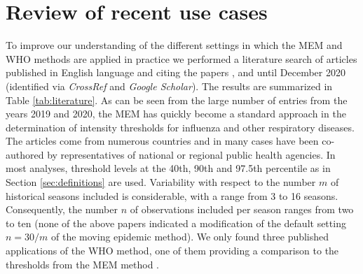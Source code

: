 \documentclass{article}
\begin{document}


\section{Review of recent use cases}
\label{sec:review}

To improve our understanding of the different settings in which the MEM and WHO methods are applied in practice we performed a literature search of articles published in English language and citing the papers \cite{Vega2015}, \cite{WHO2014} and \cite{WHO2017} until December 2020 (identified via \textit{CrossRef} and \textit{Google Scholar}). The results are summarized in Table \ref{tab:literature}. As can be seen from the large number of entries from the years 2019 and 2020, the MEM has quickly become a standard approach in the determination of intensity thresholds for influenza and other respiratory diseases. The articles come from numerous countries and in many cases have been co-authored by representatives of national or regional public health agencies. In most analyses, threshold levels at the 40th, 90th and 97.5th percentile as in Section \ref{sec:definitions} are used. Variability with respect to the number $m$ of historical seasons included is considerable, with a range from 3 to 16 seasons. Consequently, the number $n$ of observations included per season ranges from two to ten (none of the above papers indicated a modification of the default setting $n = 30/m$ of the moving epidemic method). We only found three published applications of the WHO method, one of them providing a comparison to the thresholds from the MEM method \citep{Rguig2020}.
\end{document}
